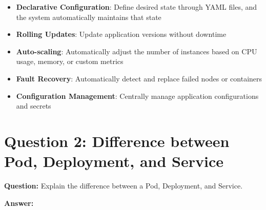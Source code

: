 \documentclass[12pt,a4paper]{article}
\begin{document}
\begin{itemize}
    \item \textbf{Declarative Configuration}: Define desired state through YAML files, and the system automatically maintains that state
    \item \textbf{Rolling Updates}: Update application versions without downtime
    \item \textbf{Auto-scaling}: Automatically adjust the number of instances based on CPU usage, memory, or custom metrics
    \item \textbf{Fault Recovery}: Automatically detect and replace failed nodes or containers
    \item \textbf{Configuration Management}: Centrally manage application configurations and secrets
\end{itemize}

\section{Question 2: Difference between Pod, Deployment, and Service}

\textbf{Question:} Explain the difference between a Pod, Deployment, and Service.

\textbf{Answer:}
\end{document}

